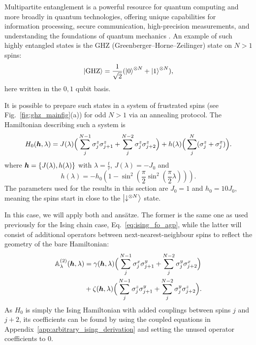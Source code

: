 Multipartite entanglement is a powerful resource for quantum computing and more broadly in quantum technologies, offering unique capabilities for information processing, secure communication, high-precision measurements, and understanding the foundations of quantum mechanics . An example of such highly entangled states is the GHZ (Greenberger–Horne–Zeilinger) state \cite{greenberger_bells_1990} on $N > 1$ spins:
\begin{equation}\label{eq:GHZ_state}
    \ket{\rm GHZ} = \frac{1}{\sqrt{2}} (\ket{0}^{\otimes N} + \ket{1}^{\otimes N}),
\end{equation}
here written in the $0,1$ qubit basis.

It is possible to prepare such states in a system of frustrated spins (see Fig.~\ref{fig:ghz_mainfig}(a)) for odd $N > 1$ via an annealing protocol. The Hamiltonian describing such a system is
\begin{equation}\label{eq:ghz_hamiltonian}
    H_0(\boldsymbol{h}, \lambda) = J(\lambda) \Big( \sum_{j}^{N-1} \sigma^z_j \sigma^z_{j+1} + \sum_{j}^{N-2} \sigma^z_j \sigma^z_{j+2} \Big) + h(\lambda) \Big( \sum_j^N (\sigma^z_j + \sigma^x_j) \Big).
\end{equation}
where $\boldsymbol{h} = \{ J(\lambda), h(\lambda) \}$ with $\lambda = \frac{t}{\tau}$, $J(\lambda)= - J_0$ and
\begin{equation}
    h(\lambda) = - h_0 \left(1 - \sin^2\left(\frac{\pi}{2} \sin^2 \left( \frac{\pi}{2} \lambda \right) \right)\right).
\end{equation}
The parameters used for the results in this section are $J_0 = 1$ and $h_0 = 10J_0$, meaning the spins start in close to the $\ket{\downarrow^{\otimes N}}$ state. 

In this case, we will apply both   and   ans\"{a}tze. The former is the same one as used previously for the Ising chain case, Eq.~\eqref{eq:ising_fo_agp}, while the latter will consist of additional operators between next-nearest-neighbour spins to reflect the geometry of the bare Hamiltonian:
\begin{equation}
    \begin{aligned}
        \mathbb{A}_{\lambda}^{(2)}(\boldsymbol{h}, \lambda) &= \gamma(\boldsymbol{h}, \lambda) \Big( \sum_{j}^{N-1} \sigma^x_j \sigma^y_{j+1} + \sum_{j}^{N-2} \sigma^y_j \sigma^x_{j+2} \Big) \\
        &+ \zeta(\boldsymbol{h}, \lambda) \Big( \sum_{j}^{N-1} \sigma^z_j \sigma^y_{j+1} + \sum_{j}^{N-2} \sigma^y_j \sigma^z_{j+2} \Big).
    \end{aligned}
\end{equation}
As $H_0$ is simply the Ising Hamiltonian with added couplings between spins $j$ and $j+2$, its  coefficients can be found by using the coupled equations in Appendix~\ref{app:arbitrary_ising_derivation} and setting the unused operator coefficients to $0$. 

